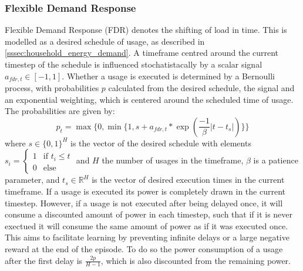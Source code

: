 \subsubsection{Flexible Demand Response}
Flexible Demand Response (FDR) denotes the shifting of load in time. This is modelled as a desired schedule of usage, as described in \ref{sssec:household_energy_demand}. A timeframe centred around the current timestep of the schedule is influenced stochatistacally by a scalar signal $a_{fdr, t} \in [-1 , 1]$. Whether a usage is executed is determined by a Bernoulli process, with probabilities $p$ calculated from the desired schedule, the signal and an exponential weighting, which is centered around the scheduled time of usage. The probabilities are given by:
\begin{equation}
    p_t = \max\{0, \min\{1, s + a_{fdr, t} * \exp(\frac{-1}{\beta}|t - t_{s}|)\}\}
\end{equation}
where $s \in \{0,1\}^{H}$ is the vector of the desired schedule with elements $s_i = \begin{cases}
    1 & \text{if } t_i \leq t \\
    0 & \text{else}
\end{cases}$ and $H$ the number of usages in the timeframe, $\beta$ is a patience parameter, and $t_{s} \in \mathbb{R}^{H}$ is the vector of desired execution times in the current timeframe. If a usage is executed its power is completely drawn in the current timestep. However, if a usage is not executed after being delayed once, it will consume a discounted amount of power in each timestep, such that if it is never exectued it will consume the same amount of power as if it was executed once. This aims to facilitate learning by preventing infinite delays or a large negative reward at the end of the episode. To do so the  power consumption of a usage after the first delay is $\frac{2p}{H-1}$, which is also discounted from the remaining power.

